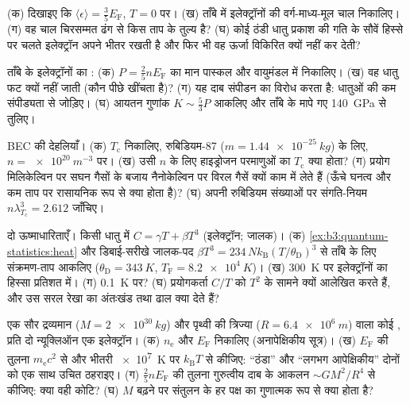 \begin{exercise}[$\star$]\label{exo:b3:quantum-statistics:2}
(क) दिखाइए कि $\langle\epsilon\rangle = \tfrac35 E_{\text{F}}$, $T =
0$ पर। (ख) ताँबे
में इलेक्ट्रॉनों की वर्ग-माध्य-मूल चाल निकालिए। (ग) वह
चाल चिरसम्मत ढंग से किस ताप के तुल्य है? (घ) कोई ठंडी धातु प्रकाश
की गति के सौवें हिस्से पर चलते इलेक्ट्रॉन अपने भीतर रखती है और फिर
भी वह ऊर्जा विकिरित क्यों नहीं कर देती?
\end{exercise}

\begin{exercise}[$\star$]\label{exo:b3:quantum-statistics:3}
ताँबे के इलेक्ट्रॉनों का : (क) $P =
\tfrac25 nE_{\text{F}}$ का मान पास्कल और वायुमंडल में निकालिए। (ख)
वह धातु फट क्यों नहीं जाती (कौन पीछे खींचता है)? (ग) यह दाब
संपीडन का विरोध करता है: धातुओं की कम संपीड्यता से जोड़िए। (घ)
आयतन गुणांक $K \sim \tfrac53 P$ आकलिए और ताँबे के मापे गए
\qty{140}{GPa} से तुलिए।
\end{exercise}

\begin{exercise}[$\star$]\label{exo:b3:quantum-statistics:4}
BEC की देहलियाँ। (क) $T_{\text{c}}$ निकालिए, रुबिडियम-87 ($m =
\qty{1.44e-25}{kg}$) के लिए, $n = \qty{e20}{m^{-3}}$ पर। (ख) उसी
$n$ के लिए हाइड्रोजन परमाणुओं का $T_{\text{c}}$ क्या होता? (ग) प्रयोग
मिलिकेल्विन पर सघन गैसों के बजाय नैनोकेल्विन पर विरल गैसें क्यों
काम में लेते हैं (ऊँचे घनत्व और कम ताप पर रासायनिक रूप से क्या होता
है)? (घ) अपनी रुबिडियम संख्याओं पर संगति-नियम $n\lambda_{T_c}^3
= 2.612$ जाँचिए।
\end{exercise}

\begin{exercise}[$\star\star$]\label{exo:b3:quantum-statistics:5}
दो ऊष्माधारिताएँ। किसी धातु में $C = \gamma T +
\beta T^3$ (इलेक्ट्रॉन; जालक)। (क)
\cref{ex:b3:quantum-statistics:heat} और डिबाई-सरीखे जालक-पद
$\beta T^3 = 234\,Nk_{\text{B}}(T/\theta_{\text{D}})^3$ से
ताँबे के लिए संक्रमण-ताप आकलिए
($\theta_{\text{D}} = \qty{343}{K}$, $T_{\text{F}} =
\qty{8.2e4}{K}$)। (ख) \qty{300}{K} पर इलेक्ट्रॉनों का हिस्सा
प्रतिशत में। (ग) \qty{0.1}{K} पर? (घ) प्रयोगकर्ता $C/T$ को
$T^2$ के सामने क्यों आलेखित करते हैं, और उस सरल रेखा का अंतःखंड तथा
ढाल क्या देते हैं?
\end{exercise}

\begin{exercise}[$\star\star$]\label{exo:b3:quantum-statistics:6}
एक सौर द्रव्यमान ($M = \qty{2e30}{kg}$) और पृथ्वी की त्रिज्या
($R = \qty{6.4e6}{m}$) वाला कोई , प्रति दो न्यूक्लिऑन एक
इलेक्ट्रॉन। (क)
$n_{\text{e}}$ और $E_{\text{F}}$ निकालिए (अनापेक्षिकीय
सूत्र)। (ख) $E_{\text{F}}$ की तुलना $m_{\text{e}}c^2$ से और
भीतरी \qty{e7}{K} पर $k_{\text{B}}T$ से कीजिए: ``ठंडा'' और
``लगभग आपेक्षिकीय'' दोनों को एक साथ उचित ठहराइए। (ग)
 $\tfrac25 nE_{\text{F}}$ की तुलना
गुरुत्वीय दाब के आकलन $\sim GM^2/R^4$ से कीजिए: क्या वही कोटि? (घ) $M$ बढ़ने पर संतुलन के हर पक्ष
का गुणात्मक रूप से क्या होता है?
\end{exercise}

